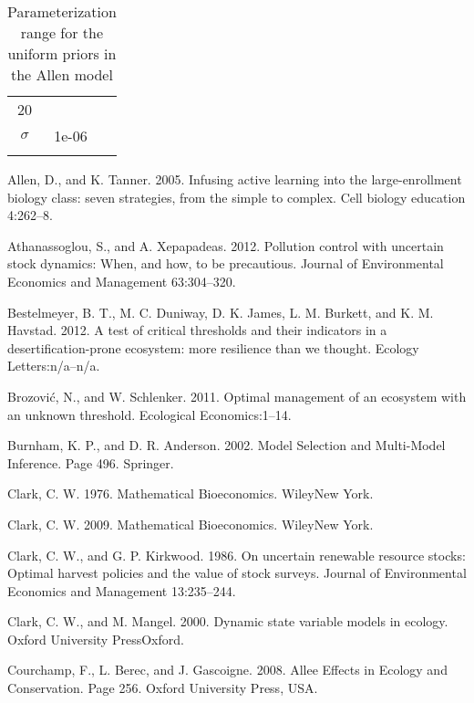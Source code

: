 \documentclass[author-year, 12pt,review]{elsarticle} %
\begin{document}
\begin{longtable}[c]{@{}ccc@{}}
\begin{minipage}[t]{0.18\columnwidth}
20
\end{minipage}
\\\addlinespace
\begin{minipage}[t]{0.15\columnwidth}\centering
$\sigma$
\end{minipage} & \begin{minipage}[t]{0.18\columnwidth}\centering
1e-06
\end{minipage} & \begin{minipage}[t]{0.18\columnwidth}\centering
100
\end{minipage}
\\\addlinespace
\bottomrule
\addlinespace
\caption{Parameterization range for the uniform priors in the Allen
model}
\end{longtable}

Allen, D., and K. Tanner. 2005. Infusing active learning into the
large-enrollment biology class: seven strategies, from the simple to
complex. Cell biology education 4:262--8.

Athanassoglou, S., and A. Xepapadeas. 2012. Pollution control with
uncertain stock dynamics: When, and how, to be precautious. Journal of
Environmental Economics and Management 63:304--320.

Bestelmeyer, B. T., M. C. Duniway, D. K. James, L. M. Burkett, and K. M.
Havstad. 2012. A test of critical thresholds and their indicators in a
desertification-prone ecosystem: more resilience than we thought.
Ecology Letters:n/a--n/a.

Brozović, N., and W. Schlenker. 2011. Optimal management of an ecosystem
with an unknown threshold. Ecological Economics:1--14.

Burnham, K. P., and D. R. Anderson. 2002. Model Selection and
Multi-Model Inference. Page 496. Springer.

Clark, C. W. 1976. Mathematical Bioeconomics. WileyNew York.

Clark, C. W. 2009. Mathematical Bioeconomics. WileyNew York.

Clark, C. W., and G. P. Kirkwood. 1986. On uncertain renewable resource
stocks: Optimal harvest policies and the value of stock surveys. Journal
of Environmental Economics and Management 13:235--244.

Clark, C. W., and M. Mangel. 2000. Dynamic state variable models in
ecology. Oxford University PressOxford.

Courchamp, F., L. Berec, and J. Gascoigne. 2008. Allee Effects in
Ecology and Conservation. Page 256. Oxford University Press, USA.
\end{document}
